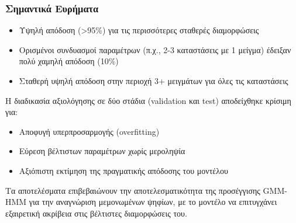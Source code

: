 \documentclass[a4paper,12pt]{article}
\begin{document}
\subsubsection*{Σημαντικά Ευρήματα}
\begin{itemize}
    \item Υψηλή απόδοση (>95\%) για τις περισσότερες σταθερές διαμορφώσεις
    \item Ορισμένοι συνδυασμοί παραμέτρων (π.χ., 2-3 καταστάσεις με 1 μείγμα) έδειξαν πολύ χαμηλή απόδοση (10\%)
    \item Σταθερή υψηλή απόδοση στην περιοχή 3+ μειγμάτων για όλες τις καταστάσεις
\end{itemize}

Η διαδικασία αξιολόγησης σε δύο στάδια (validation και test) αποδείχθηκε κρίσιμη για:
\begin{itemize}
    \item Αποφυγή υπερπροσαρμογής (overfitting)
    \item Εύρεση βέλτιστων παραμέτρων χωρίς μεροληψία
    \item Αξιόπιστη εκτίμηση της πραγματικής απόδοσης του μοντέλου
\end{itemize}

Τα αποτελέσματα επιβεβαιώνουν την αποτελεσματικότητα της προσέγγισης GMM-HMM για την αναγνώριση μεμονωμένων ψηφίων, 
με το μοντέλο να επιτυγχάνει εξαιρετική ακρίβεια στις βέλτιστες διαμορφώσεις του.



\end{document}
